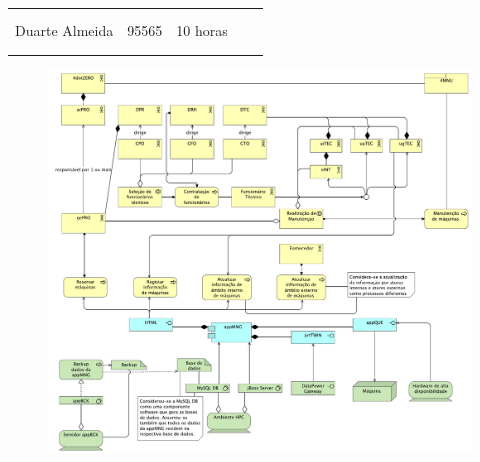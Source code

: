 \documentclass{article}
\begin{document}
\begin{table}[H]
\begin{tabular}{|l|l|l|l|l}
        \multicolumn{1}{|l|}{}                   & \multicolumn{1}{l|}{}       & \multicolumn{1}{l|}{}                             & \multicolumn{1}{l|}{}                   &  \\
        \multicolumn{1}{|l|}{}                   & \multicolumn{1}{l|}{}       & \multicolumn{1}{l|}{}                             & \multicolumn{1}{l|}{}                   &  \\
        \multicolumn{1}{|c|}{Duarte Almeida}     & \multicolumn{1}{c|}{95565}  & \multicolumn{1}{c|}{10 horas}                     & \multicolumn{1}{l|}{}                   &  \\
        \multicolumn{1}{|l|}{}                   & \multicolumn{1}{l|}{}       & \multicolumn{1}{l|}{}                             & \multicolumn{1}{l|}{}                   &  \\
        \multicolumn{1}{|l|}{}                   & \multicolumn{1}{l|}{}       & \multicolumn{1}{l|}{}                             & \multicolumn{1}{l|}{}                   &  \\ \cline{1-4}
        \end{tabular}
        \end{table}

    \pagebreak

    \vspace*{3cm}

    \begin{figure}[H]
        \centering
        \includegraphics[width=\textwidth]{modelo.pdf}
    \end{figure}
\end{document}
